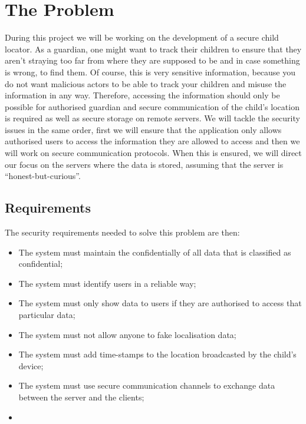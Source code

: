 \documentclass[a4paper]{article}
\begin{document}
\tableofcontents
\thispagestyle{empty}
\newpage
\setcounter{page}{1}

\pagebreak

\section{The Problem}

During this project we will be working on the development of a secure child locator. As a guardian,
one might want to track their children to ensure that they aren't straying too far from where they
are supposed to be and in case something is wrong, to find them. Of course, this is very sensitive
information, because you do not want malicious actors to be able to track your children and misuse
the information in any way. Therefore, accessing the information should only be possible for
authorised guardian and secure communication of the child's location is required as well as secure
storage on remote servers. We will tackle the security issues in the same order, first we will
ensure that the application only allows authorised users to access the information they are allowed
to access and then we will work on secure communication protocols. When this is ensured, we will
direct our focus on the servers where the data is stored, assuming that the server is
``honest-but-curious''.

\subsection{Requirements}

The security requirements needed to solve this problem are then:
\begin{itemize}
    \item The system must maintain the confidentially of all data that is classified as confidential;
    \item The system must identify users in a reliable way;
    \item The system must only show data to users if they are authorised to access that particular data;
    \item The system must not allow anyone to fake localisation data;
    \item The system must add time-stamps to the location broadcasted by the child's device;
    \item The system must use secure communication channels to exchange data between the server and the clients;
    \item
\end{itemize}
\end{document}
